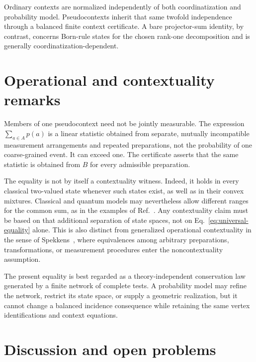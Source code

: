 \documentclass[
  twocolumn,
  aps,
  pra,
  floatfix,
  amsmath,amssymb,
  longbibliography
]{revtex4-2}
\theoremstyle{definition}
\theoremstyle{remark}
\begin{document}
Ordinary contexts are normalized independently of both coordinatization and
probability model.  Pseudocontexts inherit that same twofold independence
through a balanced finite context certificate.  A bare projector-sum identity,
by contrast, concerns Born-rule states for the chosen rank-one decomposition
and is generally coordinatization-dependent.

\section{Operational and contextuality remarks}
\label{sec:operational}

Members of one pseudocontext need not be jointly measurable.  The expression
$\sum_{a\in A}p(a)$ is a linear statistic obtained from separate, mutually
incompatible measurement arrangements and repeated preparations, not the
probability of one coarse-grained event.  It can exceed one.  The certificate asserts that
the same statistic is obtained from $B$ for every admissible preparation.

The equality is not by itself a contextuality witness.  Indeed, it holds in
every classical two-valued state whenever such states exist, as well as in
their convex mixtures.  Classical and quantum models may nevertheless allow
different ranges for the common sum, as in the examples of
Ref.~\cite{2023-navara-svozil}.  Any contextuality claim must be based on that
additional separation of state spaces, not on Eq.~\eqref{eq:universal-equality}
alone.  This is also distinct from generalized operational contextuality in
the sense of Spekkens~\cite{Spekkens-04}, where equivalences among arbitrary
preparations, transformations, or measurement procedures enter the
noncontextuality assumption.

The present equality is best regarded as a theory-independent conservation
law generated by a finite network of complete tests.  A probability model
may refine the network, restrict its state space, or supply a geometric
realization, but it cannot change a balanced incidence consequence while
retaining the same vertex identifications and context equations.

\section{Discussion and open problems}
\end{document}
